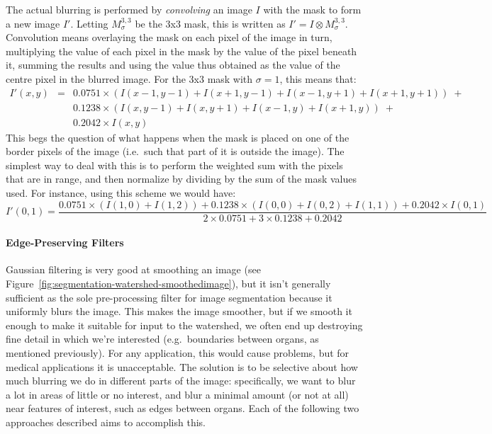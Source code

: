 The actual blurring is performed by \emph{convolving} an image $I$ with the mask to form a new image $I'$. Letting $M_\sigma^{3,3}$ be the 3x3 mask, this is written as $I' = I \otimes M_\sigma^{3,3}$. Convolution means overlaying the mask on each pixel of the image in turn, multiplying the value of each pixel in the mask by the value of the pixel beneath it, summing the results and using the value thus obtained as the value of the centre pixel in the blurred image. For the 3x3 mask with $\sigma = 1$, this means that:
%
\begin{eqnarray*}
I'(x,y)
& = & 0.0751 \times (I(x-1,y-1) + I(x+1,y-1) + I(x-1,y+1) + I(x+1,y+1)) \; + \\
&   & 0.1238 \times (I(x,y-1) + I(x,y+1) + I(x-1,y) + I(x+1,y)) \; + \\
&   & 0.2042 \times I(x,y)
\end{eqnarray*}
%
This begs the question of what happens when the mask is placed on one of the border pixels of the image (i.e.~such that part of it is outside the image). The simplest way to deal with this is to perform the weighted sum with the pixels that are in range, and then normalize by dividing by the sum of the mask values used. For instance, using this scheme we would have:
%
\[
I'(0,1) = \frac{0.0751 \times (I(1,0) + I(1,2)) + 0.1238 \times (I(0,0) + I(0,2) + I(1,1)) + 0.2042 \times I(0,1)}{2 \times 0.0751 + 3 \times 0.1238 + 0.2042}
\]

\paragraph{Edge-Preserving Filters}

Gaussian filtering is very good at smoothing an image (see Figure~\ref{fig:segmentation-watershed-smoothedimage}), but it isn't generally sufficient as the sole pre-processing filter for image segmentation because it uniformly blurs the image. This makes the image smoother, but if we smooth it enough to make it suitable for input to the watershed, we often end up destroying fine detail in which we're interested (e.g.~boundaries between organs, as mentioned previously). For any application, this would cause problems, but for medical applications it is unacceptable. The solution is to be selective about how much blurring we do in different parts of the image: specifically, we want to blur a lot in areas of little or no interest, and blur a minimal amount (or not at all) near features of interest, such as edges between organs. Each of the following two approaches described aims to accomplish this.

